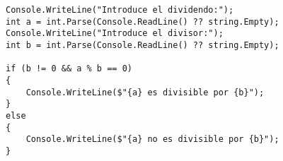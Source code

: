 \begin{lstlisting}
Console.WriteLine("Introduce el dividendo:");
int a = int.Parse(Console.ReadLine() ?? string.Empty);
Console.WriteLine("Introduce el divisor:");
int b = int.Parse(Console.ReadLine() ?? string.Empty);

if (b != 0 && a % b == 0)
{
    Console.WriteLine($"{a} es divisible por {b}");
}
else
{
    Console.WriteLine($"{a} no es divisible por {b}");
}
\end{lstlisting}
